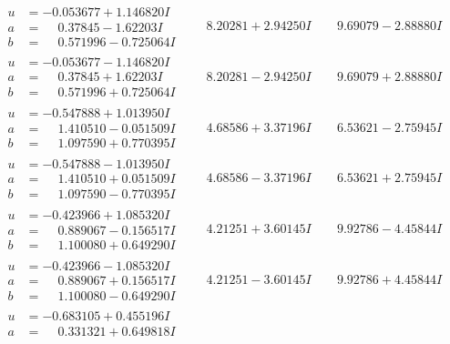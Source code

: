 \documentclass[1p]{elsarticle_modified}
\theoremstyle{definition}
\begin{document}
$$\begin{array}{c|c|c}
\begin{aligned}
u &= -0.053677 + 1.146820 I \\
a &= \phantom{-}0.37845 - 1.62203 I \\
b &= \phantom{-}0.571996 - 0.725064 I\end{aligned}
 & \phantom{-}8.20281 + 2.94250 I & \phantom{-}9.69079 - 2.88880 I \\ \hline\begin{aligned}
u &= -0.053677 - 1.146820 I \\
a &= \phantom{-}0.37845 + 1.62203 I \\
b &= \phantom{-}0.571996 + 0.725064 I\end{aligned}
 & \phantom{-}8.20281 - 2.94250 I & \phantom{-}9.69079 + 2.88880 I \\ \hline\begin{aligned}
u &= -0.547888 + 1.013950 I \\
a &= \phantom{-}1.410510 - 0.051509 I \\
b &= \phantom{-}1.097590 + 0.770395 I\end{aligned}
 & \phantom{-}4.68586 + 3.37196 I & \phantom{-}6.53621 - 2.75945 I \\ \hline\begin{aligned}
u &= -0.547888 - 1.013950 I \\
a &= \phantom{-}1.410510 + 0.051509 I \\
b &= \phantom{-}1.097590 - 0.770395 I\end{aligned}
 & \phantom{-}4.68586 - 3.37196 I & \phantom{-}6.53621 + 2.75945 I \\ \hline\begin{aligned}
u &= -0.423966 + 1.085320 I \\
a &= \phantom{-}0.889067 - 0.156517 I \\
b &= \phantom{-}1.100080 + 0.649290 I\end{aligned}
 & \phantom{-}4.21251 + 3.60145 I & \phantom{-}9.92786 - 4.45844 I \\ \hline\begin{aligned}
u &= -0.423966 - 1.085320 I \\
a &= \phantom{-}0.889067 + 0.156517 I \\
b &= \phantom{-}1.100080 - 0.649290 I\end{aligned}
 & \phantom{-}4.21251 - 3.60145 I & \phantom{-}9.92786 + 4.45844 I \\ \hline\begin{aligned}
u &= -0.683105 + 0.455196 I \\
a &= \phantom{-}0.331321 + 0.649818 I \\

\end{aligned}
\end{array}$$
\end{document}
